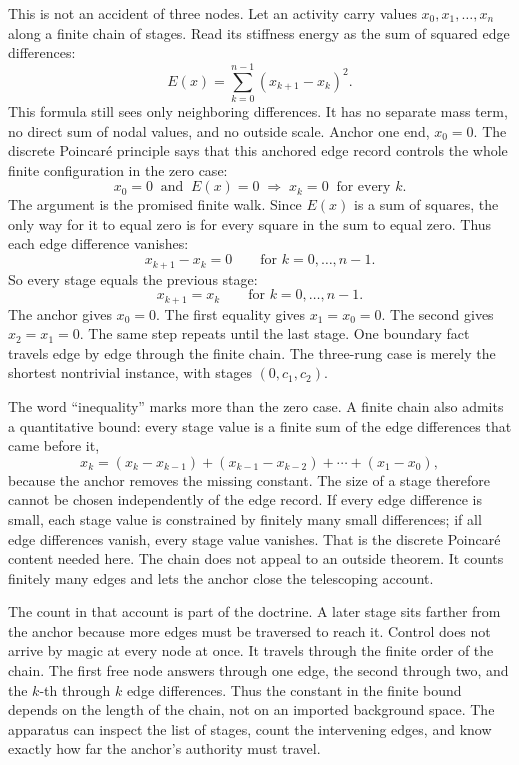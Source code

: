 This is not an accident of three nodes. Let an activity carry values
\(x_0, x_1, \ldots, x_n\) along a finite chain of stages. Read its stiffness
energy as the sum of squared edge differences:
\[
  E(x) = \sum_{k=0}^{n-1} (x_{k+1} - x_k)^{2}.
\]
This formula still sees only neighboring differences. It has no separate mass
term, no direct sum of nodal values, and no outside scale. Anchor one end,
\(x_0 = 0\). The discrete Poincaré principle says that this anchored edge
record controls the whole finite configuration in the zero case:
\[
  x_0 = 0
  \ \text{ and }\
  E(x) = 0
  \;\Longrightarrow\;
  x_k = 0
  \ \text{ for every } k.
\]
The argument is the promised finite walk. Since \(E(x)\) is a sum of squares, the
only way for it to equal zero is for every square in the sum to equal zero. Thus
each edge difference vanishes:
\[
  x_{k+1} - x_k = 0
  \qquad\text{for } k = 0,\ldots,n-1.
\]
So every stage equals the previous stage:
\[
  x_{k+1} = x_k
  \qquad\text{for } k = 0,\ldots,n-1.
\]
The anchor gives \(x_0 = 0\). The first equality gives \(x_1 = x_0 = 0\). The
second gives \(x_2 = x_1 = 0\). The same step repeats until the last stage. One
boundary fact travels edge by edge through the finite chain. The three-rung
case is merely the shortest nontrivial instance, with stages \((0,c_1,c_2)\).

The word ``inequality'' marks more than the zero case. A finite chain also
admits a quantitative bound: every stage value is a finite sum of the edge
differences that came before it,
\[
  x_k = (x_k-x_{k-1}) + (x_{k-1}-x_{k-2}) + \cdots + (x_1-x_0),
\]
because the anchor removes the missing constant. The size of a stage therefore
cannot be chosen independently of the edge record. If every edge difference is
small, each stage value is constrained by finitely many small differences; if
all edge differences vanish, every stage value vanishes. That is the discrete
Poincaré content needed here. The chain does not appeal to an outside theorem.
It counts finitely many edges and lets the anchor close the telescoping account.

The count in that account is part of the doctrine. A later stage sits farther
from the anchor because more edges must be traversed to reach it. Control does
not arrive by magic at every node at once. It travels through the finite order
of the chain. The first free node answers through one edge, the second through
two, and the \(k\)-th through \(k\) edge differences. Thus the constant in the
finite bound depends on the length of the chain, not on an imported background
space. The apparatus can inspect the list of stages, count the intervening
edges, and know exactly how far the anchor's authority must travel.


